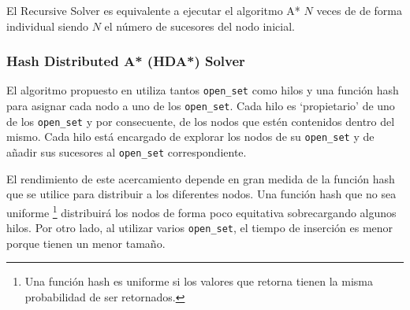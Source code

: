 \begin{keynotebox}
    El Recursive Solver es equivalente a ejecutar el algoritmo A*
    $N$ veces de de forma individual siendo $N$ el número
    de sucesores del nodo inicial.
\end{keynotebox}

\pagebreak

\subsubsection{Hash Distributed A* (HDA*) Solver}

El algoritmo propuesto en \cite{KFB09}
utiliza tantos \lstinline{open_set} como hilos
y una función hash para asignar cada nodo a uno de los
\lstinline{open_set}.
Cada hilo es `propietario' de uno de los \lstinline{open_set}
y por consecuente, de los nodos que estén contenidos
dentro del mismo.
Cada hilo está encargado de explorar los nodos de su
\lstinline{open_set} y de añadir sus sucesores
al \lstinline{open_set} correspondiente.

El rendimiento de este acercamiento depende en gran medida de la
función hash que se utilice para distribuir a los diferentes nodos.
Una función hash que no sea uniforme
\footnote{Una función hash es uniforme si los valores que retorna
tienen la misma probabilidad de ser retornados.}
distribuirá los nodos de forma poco equitativa
sobrecargando algunos hilos.
Por otro lado, al utilizar varios \lstinline{open_set},
el tiempo de inserción es menor porque tienen un menor tamaño.

